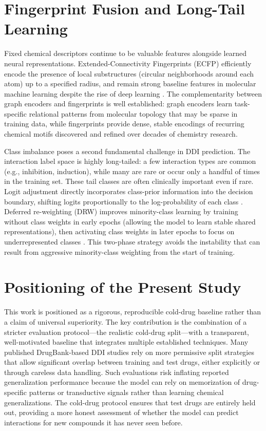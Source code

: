 \documentclass[11pt,a4paper]{report}
\begin{document}
\section{Fingerprint Fusion and Long-Tail Learning}
Fixed chemical descriptors continue to be valuable features alongside learned neural representations. Extended-Connectivity Fingerprints (ECFP) efficiently encode the presence of local substructures (circular neighborhoods around each atom) up to a specified radius, and remain strong baseline features in molecular machine learning despite the rise of deep learning \cite{rogers2010ecfp}. The complementarity between graph encoders and fingerprints is well established: graph encoders learn task-specific relational patterns from molecular topology that may be sparse in training data, while fingerprints provide dense, stable encodings of recurring chemical motifs discovered and refined over decades of chemistry research.

Class imbalance poses a second fundamental challenge in DDI prediction. The interaction label space is highly long-tailed: a few interaction types are common (e.g., inhibition, induction), while many are rare or occur only a handful of times in the training set. These tail classes are often clinically important even if rare. Logit adjustment directly incorporates class-prior information into the decision boundary, shifting logits proportionally to the log-probability of each class \cite{menon2021logit}. Deferred re-weighting (DRW) improves minority-class learning by training without class weights in early epochs (allowing the model to learn stable shared representations), then activating class weights in later epochs to focus on underrepresented classes \cite{cao2019ldam}. This two-phase strategy avoids the instability that can result from aggressive minority-class weighting from the start of training.
\section{Positioning of the Present Study}
This work is positioned as a rigorous, reproducible cold-drug baseline rather than a claim of universal superiority. The key contribution is the combination of a stricter evaluation protocol---the realistic cold-drug split---with a transparent, well-motivated baseline that integrates multiple established techniques. Many published DrugBank-based DDI studies rely on more permissive split strategies that allow significant overlap between training and test drugs, either explicitly or through careless data handling. Such evaluations risk inflating reported generalization performance because the model can rely on memorization of drug-specific patterns or transductive signals rather than learning chemical generalizations. The cold-drug protocol ensures that test drugs are entirely held out, providing a more honest assessment of whether the model can predict interactions for new compounds it has never seen before.
\end{document}
